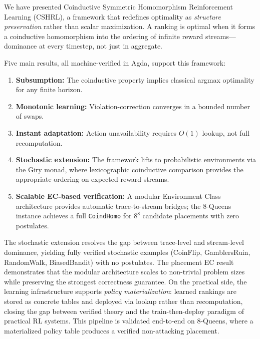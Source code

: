 \documentclass[9pt,a4paper]{article}
\theoremstyle{plain}
\theoremstyle{definition}
\theoremstyle{remark}
\begin{document}
\begin{sloppypar}
\noindent We have presented Coinductive Symmetric Homomorphism Reinforcement Learning (CSHRL), a framework that redefines optimality as \emph{structure preservation} rather than scalar maximization.  A ranking is optimal when it forms a coinductive homomorphism into the ordering of infinite reward streams---dominance at every timestep, not just in aggregate.
\end{sloppypar}

Five main results, all machine-verified in Agda, support this framework:
\begin{enumerate}
\item \textbf{Subsumption:} The coinductive property implies classical argmax optimality for any finite horizon.
\item \textbf{Monotonic learning:} Violation-correction converges in a bounded number of swaps.
\item \textbf{Instant adaptation:} Action unavailability requires $O(1)$ lookup, not full recomputation.
\item \textbf{Stochastic extension:} The framework lifts to probabilistic environments via the Giry monad, where lexicographic coinductive comparison provides the appropriate ordering on expected reward streams.
\item \textbf{Scalable EC-based verification:} A modular Environment Class architecture provides automatic trace-to-stream bridges; the $8$-Queens instance achieves a full \texttt{CoindHomo} for $8^8$ candidate placements with zero postulates.
\end{enumerate}

\noindent The stochastic extension resolves the gap between trace-level and stream-level dominance, yielding fully verified stochastic examples (CoinFlip, GamblersRuin, RandomWalk, BiasedBandit) with no postulates. The placement EC result demonstrates that the modular architecture scales to non-trivial problem sizes while preserving the strongest correctness guarantee.  On the practical side, the learning infrastructure supports \emph{policy materialization}: learned rankings are stored as concrete tables and deployed via lookup rather than recomputation, closing the gap between verified theory and the train-then-deploy paradigm of practical RL systems.  This pipeline is validated end-to-end on $8$-Queens, where a materialized policy table produces a verified non-attacking placement.

\end{document}
